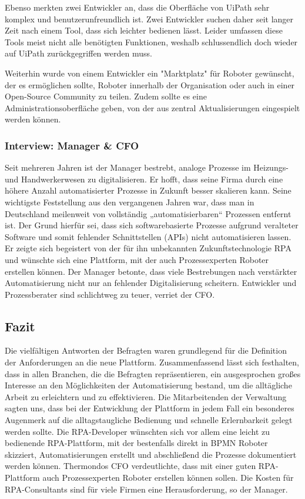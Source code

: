 Ebenso merkten zwei Entwickler an, dass die Oberfläche von UiPath sehr komplex und benutzerunfreundlich ist. Zwei Entwickler suchen daher seit langer Zeit nach einem Tool, dass sich leichter bedienen lässt. Leider umfassen diese Tools meist nicht alle benötigten Funktionen, weshalb schlussendlich doch wieder auf UiPath zurückgegriffen werden muss. 

Weiterhin wurde von einem Entwickler ein "Marktplatz"  für Roboter gewünscht, der es ermöglichen sollte, Roboter innerhalb der Organisation oder auch in einer Open-Source Community zu teilen. Zudem sollte es eine Administrationsoberfläche geben, von der aus zentral Aktualisierungen eingespielt werden können. 

\subsubsection{Interview: Manager \& CFO}
Seit mehreren Jahren ist der Manager bestrebt, analoge Prozesse im Heizungs- und Handwerkerwesen zu digitalisieren. Er hofft, dass seine Firma durch eine höhere Anzahl automatisierter Prozesse in Zukunft besser skalieren kann. Seine wichtigste Feststellung aus den vergangenen Jahren war, dass man in Deutschland meilenweit von vollständig „automatisierbaren“ Prozessen entfernt ist. Der Grund hierfür sei, dass sich softwarebasierte Prozesse aufgrund veralteter Software und somit fehlender Schnittstellen (APIs) nicht automatisieren lassen. Er zeigte sich begeistert von der für ihn unbekannten Zukunftstechnologie RPA und wünschte sich eine Plattform, mit der auch Prozessexperten Roboter erstellen können. Der Manager betonte, dass viele Bestrebungen nach verstärkter Automatisierung nicht nur an fehlender Digitalisierung scheitern. \glqq Entwickler und Prozessberater sind schlichtweg zu teuer\grqq{}, verriet der CFO.

\subsection{Fazit}
\label{anforderungsanalyse:fazit}
Die vielfältigen Antworten der Befragten waren grundlegend für die Definition der Anforderungen an die neue Plattform. Zusammenfassend lässt sich festhalten, dass in allen Branchen, die die Befragten repräsentieren, ein ausgesprochen großes Interesse an den Möglichkeiten der Automatisierung bestand, um die alltägliche Arbeit zu erleichtern und zu effektivieren. 
Die Mitarbeitenden der Verwaltung sagten uns, dass bei der Entwicklung der Plattform in jedem Fall ein besonderes Augenmerk auf die alltagstaugliche Bedienung und schnelle Erlernbarkeit gelegt werden sollte. Die RPA-Developer wünschten sich vor allem eine leicht zu bedienende RPA-Plattform, mit der bestenfalls direkt in BPMN Roboter skizziert, Automatisierungen erstellt und abschließend die Prozesse dokumentiert werden können. Thermondos CFO verdeutlichte, dass mit einer guten RPA-Plattform auch Prozessexperten Roboter erstellen können sollen. \glqq Die Kosten für RPA-Consultants sind für viele Firmen eine Herausforderung\grqq{}, so der Manager. 

